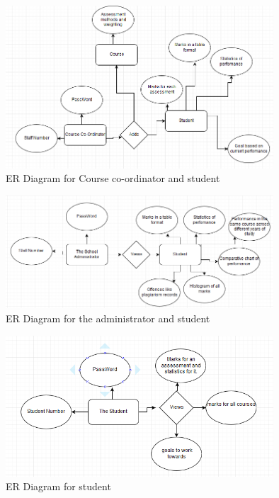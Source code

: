 \documentclass[10pt,onecolumn]{RequimentsGathering}
\begin{document}
\begin{center}
\begin{figure}[h]
\centering
\includegraphics[width=10cm]{ER1}
\caption{ER Diagram for Course co-ordinator and student}
\end{figure}
\end{center}

\begin{center}
\begin{figure}[h]
\centering
\includegraphics[width=10cm]{ER2}
\caption{ER Diagram for the administrator and student}
\end{figure}
\end{center}

\newpage

\begin{center}
\begin{figure}[h]
\centering
\includegraphics[width=10cm]{ER3}
\caption{ER Diagram for student}
\end{figure}
\end{center}
\end{document}
